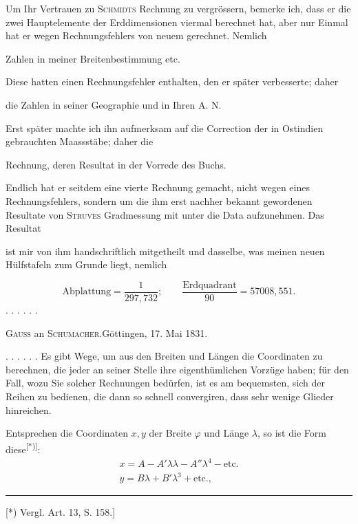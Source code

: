 Um Ihr Vertrauen zu \textsc{Schmidts} Rechnung zu vergrössern, bemerke ich, dass er die zwei Hauptelemente der Erddimensionen viermal berechnet hat, aber nur Einmal hat er wegen Rechnungsfehlers von neuem gerechnet. Nemlich
\begin{list}{}{\setlength{\leftmargin}{2em}\setlength{\itemsep}{0pt}\setlength{\parsep}{0pt}}
\item[1)] Zahlen in meiner Breitenbestimmung etc.

Diese hatten einen Rechnungsfehler enthalten, den er später verbesserte; daher
\item[2)] die Zahlen in seiner Geographie und in Ihren A. N.

Erst später machte ich ihn aufmerksam auf die Correction der in Ostindien gebrauchten Maassstäbe; daher die
\item[3)] Rechnung, deren Resultat in der Vorrede des Buchs.

Endlich hat er seitdem eine vierte Rechnung gemacht, nicht wegen eines Rechnungsfehlers, sondern um die ihm erst nachher bekannt gewordenen Resultate von \textsc{Struves} Gradmessung mit unter die Data aufzunehmen. Das Resultat
\item[4)] ist mir von ihm handschriftlich mitgetheilt und dasselbe, was meinen neuen Hülfstafeln zum Grunde liegt, nemlich
\end{list}
\[
\text{Abplattung}=\frac1{297{,}732};\qquad
\frac{\text{Erdquadrant}}{90}=57008{,}551.
\]
. . . . . .
\bigskip
\begin{center}\textsc{Gauss} an \textsc{Schumacher}.\quad Göttingen, 17. Mai 1831.\end{center}
. . . . . . Es gibt  Wege, um aus den Breiten und Längen die Coordinaten zu berechnen, die jeder an seiner Stelle ihre eigenthümlichen Vorzüge haben; für den Fall, wozu Sie solcher Rechnungen bedürfen, ist es am bequemsten, sich der Reihen zu bedienen, die dann so schnell convergiren, dass sehr wenige Glieder hinreichen.

Entsprechen die Coordinaten \(x,y\) der Breite \(\varphi\) und Länge \(\lambda\), so ist die Form diese\textsuperscript{[*)]}:
\[
\begin{array}{l}
x=A-A'\lambda\lambda-A''\lambda^4-\text{etc.}\\
y=B\lambda+B'\lambda^3+\text{etc.},
\end{array}
\]
\par\noindent\rule{4cm}{.4pt}\par
{\footnotesize\noindent\hspace*{\parindent}[*) Vergl. Art. 13, S. 158.]\par}

